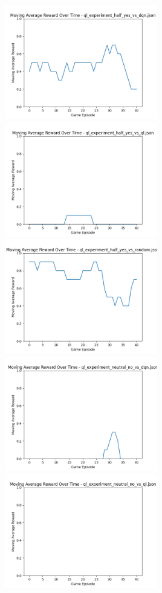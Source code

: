 \includegraphics[width=0.5\textwidth]{images/moving_average_reward_ql_experiment_half_yes_vs_dqn.png} 
\includegraphics[width=0.5\textwidth]{images/moving_average_reward_ql_experiment_half_yes_vs_ql.png} 
\includegraphics[width=0.5\textwidth]{images/moving_average_reward_ql_experiment_half_yes_vs_random.png} 
\includegraphics[width=0.5\textwidth]{images/moving_average_reward_ql_experiment_neutral_no_vs_dqn.png} 
\includegraphics[width=0.5\textwidth]{images/moving_average_reward_ql_experiment_neutral_no_vs_ql.png} 
